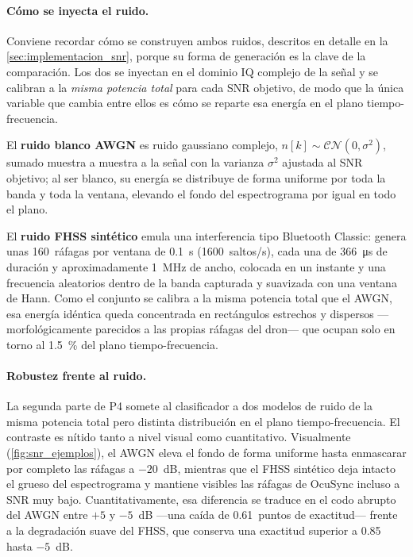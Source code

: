 \paragraph{Cómo se inyecta el ruido.}
Conviene recordar cómo se construyen ambos ruidos, descritos en detalle en la \cref{sec:implementacion_snr}, porque su forma de generación es la clave de la comparación. Los dos se inyectan en el dominio IQ complejo de la señal y se calibran a la \emph{misma potencia total} para cada SNR objetivo, de modo que la única variable que cambia entre ellos es cómo se reparte esa energía en el plano tiempo-frecuencia. 

El \textbf{ruido blanco AWGN} es ruido gaussiano complejo, $n[k]\sim\mathcal{CN}(0,\sigma^2)$, sumado muestra a muestra a la señal con la varianza $\sigma^2$ ajustada al SNR objetivo; al ser blanco, su energía se distribuye de forma uniforme por toda la banda y toda la ventana, elevando el fondo del espectrograma por igual en todo el plano. 

El \textbf{ruido FHSS sintético} emula una interferencia tipo Bluetooth Classic: genera unas \num{160}~ráfagas por ventana de \SI{0.1}{\second} (\num{1600}~saltos/s), cada una de \SI{366}{\micro\second} de duración y aproximadamente \SI{1}{\mega\hertz} de ancho, colocada en un instante y una frecuencia aleatorios dentro de la banda capturada y suavizada con una ventana de Hann. Como el conjunto se calibra a la misma potencia total que el AWGN, esa energía idéntica queda concentrada en rectángulos estrechos y dispersos ---morfológicamente parecidos a las propias ráfagas del dron--- que ocupan solo en torno al \SI{1,5}{\percent} del plano tiempo-frecuencia.

\paragraph{Robustez frente al ruido.}
La segunda parte de P4 somete al clasificador a dos modelos de ruido de la misma potencia total pero distinta distribución en el plano tiempo-frecuencia. El contraste es nítido tanto a nivel visual como cuantitativo. Visualmente (\cref{fig:snr_ejemplos}), el AWGN eleva el fondo de forma uniforme hasta enmascarar por completo las ráfagas a $-20$~dB, mientras que el FHSS sintético deja intacto el grueso del espectrograma y mantiene visibles las ráfagas de OcuSync incluso a SNR muy bajo. Cuantitativamente, esa diferencia se traduce en el codo abrupto del AWGN entre $+5$ y $-5$~dB ---una caída de \num{0,61}~puntos de exactitud--- frente a la degradación suave del FHSS, que conserva una exactitud superior a \num{0,85} hasta $-5$~dB.

